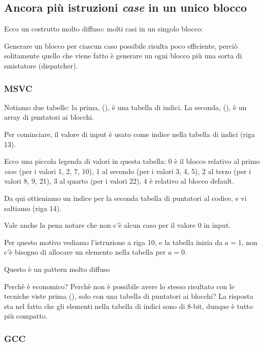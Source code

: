 \subsection{Ancora più istruzioni \emph{case} in un unico blocco}

Ecco un costrutto molto diffuso: molti casi in un singolo blocco:


Generare un blocco per ciascun caso possibile risulta poco efficiente, perciò solitamente quello che viene fatto è generare un
ogni blocco più una sorta di smistatore (dispatcher).

\subsubsection{MSVC}



Notiamo due tabelle: la prima, (), è una tabella di indici. La seconda, (), è un array di puntatori ai blocchi.

Per cominciare, il valore di input è usato come indice nella tabella di indici (riga 13).

Ecco una piccola legenda di valori in questa tabella:
0 è il blocco relativo al primo \emph{case} (per i valori 1, 2, 7, 10),
1 al secondo (per i valori 3, 4, 5),
2 al terzo (per i valori 8, 9, 21),
3 al quarto (per i valori 22),
4 è relativo al blocco default.

Da qui ottieniamo un indice per la seconda tabella di puntatori al codice, e vi saltiamo (riga 14).

Vale anche la pena notare che non c'è alcun caso per il valore 0 in input.

Per questo motivo vediamo l'istruzione \DEC a riga 10, e la tabella inizia da $a=1$, 
non c'è bisogno di allocare un elemento nella tabella per $a=0$.

Questo è un pattern molto diffuso

Perchè è economico? Perchè non è possibile avere lo stesso risultato con le tecniche viste prima 
(), solo con una tabella di puntatori ai blocchi?
La risposta sta nel fatto che gli elementi nella tabella di indici sono di 8-bit, dunque è tutto più compatto.

\subsubsection{GCC}


